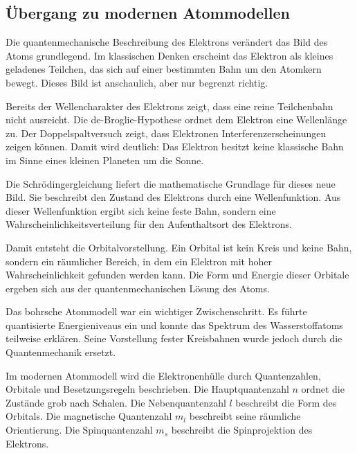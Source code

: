 \subsection{Übergang zu modernen Atommodellen}
\label{subsec:uebergang_moderne_atommodelle}

Die quantenmechanische Beschreibung des Elektrons verändert das
Bild des Atoms grundlegend. Im klassischen Denken erscheint das Elektron als
kleines geladenes Teilchen, das sich auf einer bestimmten Bahn um den Atomkern
 bewegt. Dieses Bild ist anschaulich, aber nur begrenzt richtig.

Bereits der Wellencharakter des Elektrons
zeigt, dass eine reine Teilchenbahn nicht ausreicht. Die de-Broglie-Hypothese
 ordnet dem Elektron eine Wellenlänge zu. Der
Doppelspaltversuch zeigt, dass Elektronen
Interferenzerscheinungen zeigen können. Damit wird deutlich:
Das Elektron besitzt keine klassische Bahn im Sinne eines kleinen Planeten um
die Sonne.

Die Schrödingergleichung liefert die mathematische
Grundlage für dieses neue Bild. Sie beschreibt den Zustand des Elektrons durch
eine Wellenfunktion. Aus dieser Wellenfunktion ergibt
sich keine feste Bahn, sondern eine Wahrscheinlichkeitsverteilung
 für den Aufenthaltsort des Elektrons.

Damit entsteht die Orbitalvorstellung. Ein Orbital
 ist kein Kreis und keine Bahn, sondern ein räumlicher Bereich,
in dem ein Elektron mit hoher Wahrscheinlichkeit gefunden werden kann. Die Form
und Energie dieser Orbitale ergeben sich aus der quantenmechanischen Lösung des
Atoms.

Das bohrsche Atommodell war ein wichtiger
Zwischenschritt. Es führte quantisierte Energieniveaus
ein und konnte das Spektrum des Wasserstoffatoms
teilweise erklären. Seine Vorstellung fester Kreisbahnen wurde jedoch durch die
Quantenmechanik ersetzt.

Im modernen Atommodell wird die Elektronenhülle
 durch Quantenzahlen, Orbitale und
Besetzungsregeln beschrieben. Die Hauptquantenzahl \(n\)
ordnet die Zustände grob nach Schalen. Die Nebenquantenzahl
\(l\) beschreibt die Form des Orbitals. Die magnetische
Quantenzahl \(m_l\) beschreibt seine räumliche
Orientierung. Die Spinquantenzahl \(m_s\) beschreibt die
Spinprojektion des Elektrons.

